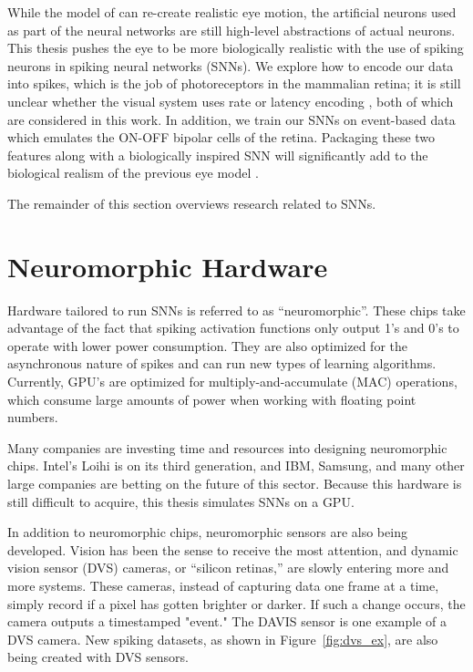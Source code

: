 \documentclass [MS] {UCLAthesis}
\begin{document}
While the model of \citet{Arjun} can re-create realistic eye motion, the artificial neurons used as part of the neural networks are still high-level abstractions of actual neurons. This thesis pushes the eye to be more biologically realistic with the use of spiking neurons in spiking neural networks (SNNs). We explore how to encode our data into spikes, which is the job of photoreceptors in the mammalian retina; it is still unclear whether the visual system uses rate or latency encoding \citep{encoding_retina}, both of which are considered in this work. In addition, we train our SNNs on event-based data which emulates the ON-OFF bipolar cells of the retina. Packaging these two features along with a biologically inspired SNN will significantly add to the biological realism of the previous eye model \citep{Arjun}.

The remainder of this section overviews research related to SNNs.


\section{Neuromorphic Hardware}

Hardware tailored to run SNNs is referred to as ``neuromorphic''. These chips take advantage of the fact that spiking activation functions only output 1's and 0's to operate with lower power consumption. They are also optimized for the asynchronous nature of spikes and can run new types of learning algorithms. Currently, GPU's are optimized for multiply-and-accumulate (MAC) operations, which consume large amounts of power when working with floating point numbers. 

Many companies are investing time and resources into designing neuromorphic chips. Intel's Loihi \citep{8259423} is on its third generation, and IBM, Samsung, and many other large companies are betting on the future of this sector. Because this hardware is still difficult to acquire, this thesis simulates SNNs on a GPU.

In addition to neuromorphic chips, neuromorphic sensors are also being developed. Vision has been the sense to receive the most attention, and dynamic vision sensor (DVS) cameras, or ``silicon retinas,'' are slowly entering more and more systems. These cameras, instead of capturing data one frame at a time, simply record if a pixel has gotten brighter or darker. If such a change occurs, the camera outputs a timestamped "event." The DAVIS sensor \citep{davis_dvs} is one example of a DVS camera. New spiking datasets, as shown in Figure~\ref{fig:dvs_ex}, are also being created with DVS sensors. 
\end{document}
